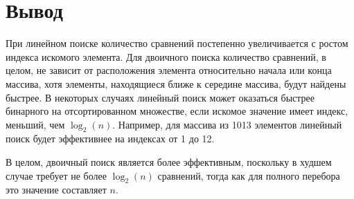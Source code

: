 \clearpage
\section{Вывод}

При линейном поиске количество сравнений постепенно увеличивается с ростом индекса искомого элемента. Для двоичного поиска количество сравнений, в целом, не зависит от расположения элемента относительно начала или конца массива, хотя элементы, находящиеся ближе к середине массива, будут найдены быстрее. В некоторых случаях линейный поиск может оказаться быстрее бинарного на отсортированном множестве, если искомое значение имеет индекс, меньший, чем $\log_2(n)$. Например, для массива из 1013 элементов линейный поиск будет эффективнее на индексах от 1 до 12. 

В целом, двоичный поиск является более эффективным, поскольку в худшем случае требует не более $\log_2(n)$ сравнений, тогда как для полного перебора это значение составляет $n$.






